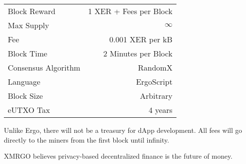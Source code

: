 \documentclass{article}
\begin{document}
\begin{table}[h!]
\begin{center}
    \begin{tabular}{l|r} %
    \hline
    Block Reward & 1 XER + Fees per Block\\
    Max Supply & $\infty$\\
    Fee & 0.001 XER per kB\\
    Block Time & 2 Minutes per Block\\
    Consensus Algorithm & RandomX\\
    Language & ErgoScript\\
    Block Size & Arbitrary\\
    eUTXO Tax & 4 years\\
    \end{tabular}
\end{center}
\end{table}

\indent Unlike Ergo, there will not be a treasury for dApp development. All fees will go directly to the miners from the first block until infinity.

\clearpage

\noindent XMRGO believes privacy-based decentralized finance is the future of money.
\end{document}
